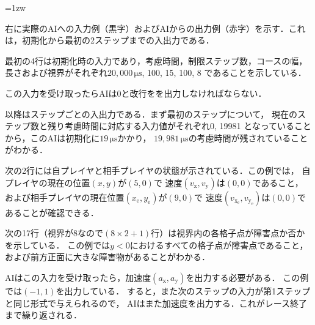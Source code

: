 \documentclass[11pt]{jarticle}
\begin{document}
\begin{minipage}[t]{.6\textwidth}

\parindent=1zw

右に実際のAIへの入力例（黒字）およびAIからの出力例（赤字）を示す．これは，初期化から最初の2ステップまでの入出力である．

最初の4行は初期化時の入力であり，考慮時間，制限ステップ数，コースの幅，
長さおよび視界がそれぞれ$20,000\,\si{\micro\second}$, 100, 15, 100, 8
であることを示している．

この入力を受け取ったらAIは0と改行をを出力しなければならない．

以降はステップごとの入出力である．まず最初のステップについて，
現在のステップ数と残り考慮時間に対応する入力値がそれぞれ0, 19981
となっていることから，このAIは初期化に$19\,\si{\micro\second}$かかり，
$19,981\,\si{\micro\second}$の考慮時間が残されていることがわかる．

次の2行には自プレイヤと相手プレイヤの状態が示されている．この例では，
自プレイヤの現在の位置$(x,y)$が$(5,0)$で
速度$(v_\mathrm{x},v_\mathrm{y})$は$(0,0)$であること，
および相手プレイヤの現在位置$(x_\mathrm{e},y_\mathrm{e})$が$(9,0)$で
速度$(v_{\mathrm{x}_\mathrm{e}},v_{\mathrm{y}_\mathrm{e}})$は$(0,0)$であることが確認できる．

次の17行（視界が$8$なので$(8 \times 2 + 1)$行）は視界内の各格子点が障害点か否かを示している．
この例では$y < 0$におけるすべての格子点が障害点であること，
および前方正面に大きな障害物があることがわかる．

AIはこの入力を受け取ったら，加速度$(a_\mathrm{x}, a_\mathrm{y})$を出力する必要がある．
この例では$(-1, 1)$を出力している．
すると，また次のステップの入力が第1ステップと同じ形式で与えられるので，
AIはまた加速度を出力する．これがレース終了まで繰り返される．

\end{minipage}
\hfill
\end{document}
